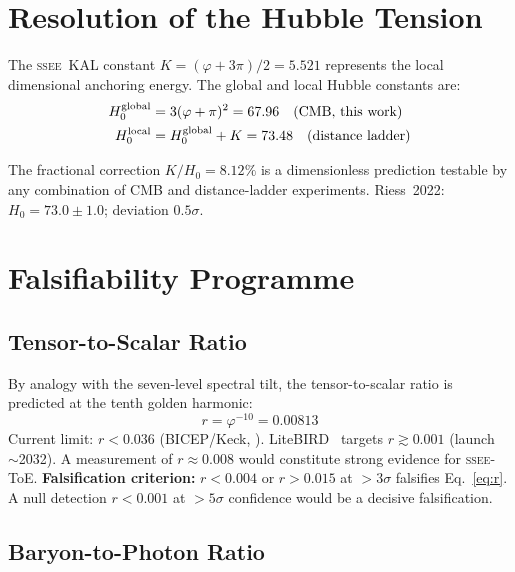 \documentclass[12pt,a4paper]{article}
\newcommand{\SSEE}{\ifmmode\mathrm{SSEE}\else\textsc{ssee}\fi}
\begin{document}
\section{Resolution of the Hubble Tension}
\label{sec:hubble_tension}

The \SSEE\ KAL constant $K = (\varphi+3\pi)/2 = 5.521$ represents the local
dimensional anchoring energy.  The global and local Hubble constants are:
\begin{align}
H_0^{\rm global} &= 3(\varphi+\pi)^2 = 67.96
  \quad \text{(CMB, this work)} \\
H_0^{\rm local}  &= H_0^{\rm global} + K = 73.48
  \quad \text{(distance ladder)}
\end{align}

The fractional correction $K/H_0 = 8.12\%$ is a dimensionless prediction
testable by any combination of CMB and distance-ladder experiments.
Riess~2022: $H_0 = 73.0\pm1.0$; deviation $0.5\sigma$.

\section{Falsifiability Programme}
\label{sec:falsifiability}

\subsection{Tensor-to-Scalar Ratio}

By analogy with the seven-level spectral tilt, the tensor-to-scalar ratio is
predicted at the tenth golden harmonic:
\begin{equation}
\boxed{r = \varphi^{-10} = 0.00813}
\label{eq:r}
\end{equation}
Current limit: $r<0.036$ (BICEP/Keck, \citep{BICEPKeck2021}).
LiteBIRD~\citep{LiteBIRD2023} targets $r\gtrsim0.001$ (launch~$\sim$2032).
A measurement of $r\approx0.008$ would constitute strong evidence for \SSEE-ToE.
\textbf{Falsification criterion:} $r < 0.004$ or $r > 0.015$ at $>3\sigma$ falsifies Eq.~\eqref{eq:r}.
A null detection $r<0.001$ at $>5\sigma$ confidence would be a decisive falsification.

\subsection{Baryon-to-Photon Ratio}
\end{document}
